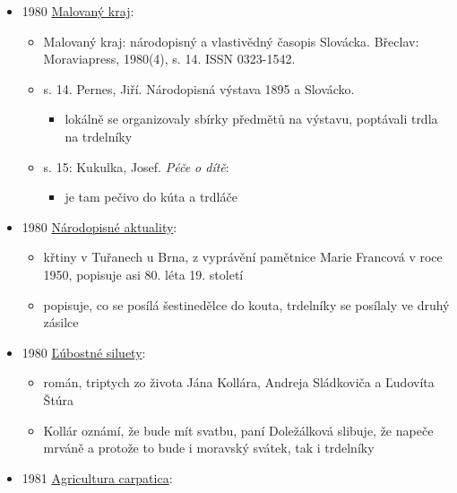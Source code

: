 \begin{itemize}
  \begin{itemize}
  \tightlist
  \item
    Etnografická expozice \emph{Cesta Slovácké vesnice od feudalismu k
    socialismu}, mají vystavený trdlo na pečení trdelníků
  \end{itemize}
\item
  1980
  \href{https://ceskadigitalniknihovna.cz/uuid/uuid:79871740-f2ac-11e3-a2c6-005056827e51}{Malovaný
  kraj}:

  \begin{itemize}
  \tightlist
  \item
    Malovaný kraj: národopisný a vlastivědný časopis Slovácka. Břeclav:
    Moraviapress, 1980(4), s. 14. ISSN 0323-1542.
  \item
    s. 14. Pernes, Jiří. Národopisná výstava 1895 a Slovácko.

    \begin{itemize}
    \tightlist
    \item
      lokálně se organizovaly sbírky předmětů na výstavu, poptávali
      trdla na trdelníky
    \end{itemize}
  \item
    s. 15: Kukulka, Josef. \emph{Péče o dítě}:

    \begin{itemize}
    \tightlist
    \item
      je tam pečivo do kúta a trdláče
    \end{itemize}
  \end{itemize}
\item
  1980
  \href{https://ceskadigitalniknihovna.cz/uuid/uuid:48f04200-3b6c-11e5-8b04-5ef3fc9bb22f}{Národopisné
  aktuality}:

  \begin{itemize}
  \tightlist
  \item
    křtiny v Tuřanech u Brna, z vyprávění pamětnice Marie Francová v
    roce 1950, popisuje asi 80. léta 19. století
  \item
    popisuje, co se posílá šestinedělce do kouta, trdelníky se posílaly
    ve druhý zásilce
  \end{itemize}
\item
  1980
  \href{https://dikda.snk.sk/uuid/uuid:1e4a583b-e745-48a1-a1af-55045e9c7694}{Ľúbostné
  siluety}:

  \begin{itemize}
  \tightlist
  \item
    román, triptych zo života Jána Kollára, Andreja Sládkoviča a
    Ľudovíta Štúra
  \item
    Kollár oznámí, že bude mít svatbu, paní Doležálková slibuje, že
    napeče mrváně a protože to bude i moravský svátek, tak i trdelníky
  \end{itemize}
\item
  1981
  \href{https://ndk.cz/uuid/uuid:6927e180-d0b8-11e6-8032-005056827e52}{Agricultura
  carpatica}:


\end{itemize}
